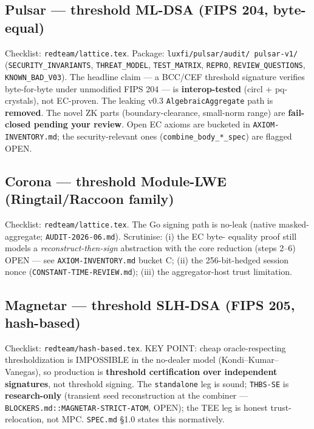 \documentclass[11pt]{article}
\begin{document}
\subsection{Pulsar --- threshold ML-DSA (FIPS 204, byte-equal)}
Checklist: \texttt{redteam/lattice.tex}. Package: \texttt{luxfi/pulsar/audit/
pulsar-v1/} (\texttt{SECURITY\_INVARIANTS}, \texttt{THREAT\_MODEL},
\texttt{TEST\_MATRIX}, \texttt{REPRO}, \texttt{REVIEW\_QUESTIONS},
\texttt{KNOWN\_BAD\_V03}). The headline claim --- a BCC/CEF threshold signature
verifies byte-for-byte under unmodified FIPS 204 --- is \textbf{interop-tested}
(circl + pq-crystals), not EC-proven. The leaking v0.3 \texttt{AlgebraicAggregate}
path is \textbf{removed}. The novel ZK parts (boundary-clearance, small-norm
range) are \textbf{fail-closed pending your review}. Open EC axioms are
bucketed in \texttt{AXIOM-INVENTORY.md}; the security-relevant ones
(\texttt{combine\_body\_*\_spec}) are flagged OPEN.

\subsection{Corona --- threshold Module-LWE (Ringtail/Raccoon family)}
Checklist: \texttt{redteam/lattice.tex}. The Go signing path is no-leak (native
masked-aggregate; \texttt{AUDIT-2026-06.md}). Scrutinise: (i) the EC byte-
equality proof still models a \emph{reconstruct-then-sign} abstraction with the
core reduction (steps 2--6) OPEN --- see \texttt{AXIOM-INVENTORY.md} bucket C;
(ii) the 256-bit-hedged session nonce (\texttt{CONSTANT-TIME-REVIEW.md}); (iii)
the aggregator-host trust limitation.

\subsection{Magnetar --- threshold SLH-DSA (FIPS 205, hash-based)}
Checklist: \texttt{redteam/hash-based.tex}. KEY POINT: cheap oracle-respecting
thresholdization is IMPOSSIBLE in the no-dealer model (Kondi--Kumar--Vanegas),
so production is \textbf{threshold certification over independent signatures},
not threshold signing. The \texttt{standalone} leg is sound; \texttt{THBS-SE}
is \textbf{research-only} (transient seed reconstruction at the combiner ---
\texttt{BLOCKERS.md::MAGNETAR-STRICT-ATOM}, OPEN); the TEE leg is honest
trust-relocation, not MPC. \texttt{SPEC.md} \S1.0 states this normatively.
\end{document}
